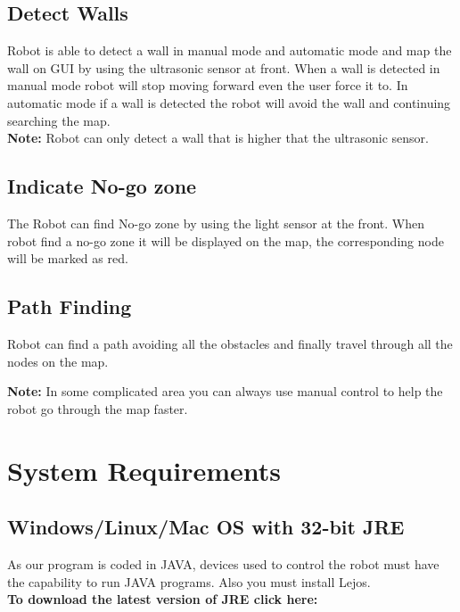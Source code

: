 \documentclass[11pt, a4paper]{report}
\begin{document}
\section{Detect Walls}
Robot is able to detect a wall in manual mode and automatic mode and map the wall on GUI by using the ultrasonic sensor at front. When a wall is detected in manual mode robot will stop moving forward even the user force it to. In automatic mode if a wall is detected the robot will avoid the wall and continuing searching the map.\\


\noindent\textbf{Note: } Robot can only detect a wall that is higher that the ultrasonic sensor.


\section{Indicate No-go zone}
The Robot can find No-go zone by using the light sensor at the front. When robot find a no-go zone it will be displayed on the map, the corresponding node will be marked as red.

\section{Path Finding}
Robot can find a path avoiding all the obstacles and finally travel through all the nodes on the map.

\noindent\textbf{Note: } In some complicated area you can always use manual control to help the robot go through the map faster.



\chapter {System Requirements}

\section {Windows/Linux/Mac OS with 32-bit JRE}
As our program is coded in JAVA, devices used to control the robot must have the capability to run JAVA programs. Also you must install Lejos.\\

\noindent\textbf {To download the latest version of JRE click here:}\\

\\
\end{document}
